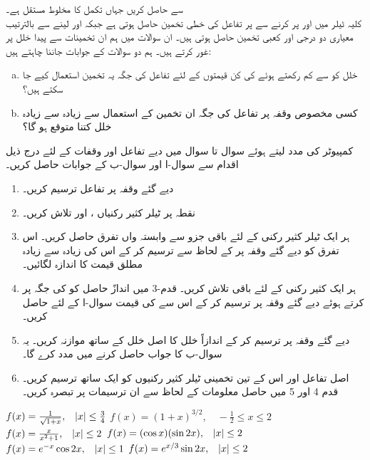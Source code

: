 سے حاصل کریں جہاں  تکمل کا مخلوط مستقل ہے۔
\\
کلیہ ٹیلر میں  اور  پر کرنے سے  پر تفاعل کی خطی تخمین حاصل ہوتی ہے جبکہ  اور  لینے سے بالترتیب معیاری دو درجی اور کعبی تخمین حاصل ہوتی ہیں۔ ان سوالات میں ہم ان تخمینات سے پیدا خلل پر غور کرتے ہیں۔ ہم دو سوالات کے جوابات جاننا چاہتے ہیں:
\begin{enumerate}[a.]
\item
خلل کو  سے کم رکھتے ہوئے  کی کن قیمتوں کے لئے تفاعل کی جگہ یہ تخمین استعمال کیے جا سکتے ہیں؟
\item
کسی مخصوص وقفہ پر تفاعل کی جگہ ان تخمین کے استعمال سے زیادہ سے زیادہ خلل کتنا متوقع ہو گا؟
\end{enumerate}
کمپیوٹر کی مدد لیتے ہوئے سوال  تا سوال  میں دیے تفاعل اور وقفات کے لئے  درج ذیل اقدام سے سوال-ا اور سوال-ب کے جوابات حاصل کریں۔
\begin{enumerate}[1.]
\item
دیے گئے وقفہ پر تفاعل ترسیم کریں۔
\item
نقطہ  پر ٹیلر کثیر رکنیاں ،  اور  تلاش کریں۔ 
\item
ہر ایک ٹیلر کثیر رکنی کے لئے باقی جزو سے وابستہ   واں تفرق  حاصل کریں۔ اس تفرق کو دیے گئے وقفہ پر   کے لحاظ سے ترسیم کر کے اس کی زیادہ سے زیادہ مطلق قیمت  کا اندازہ لگائیں۔
\item
ہر ایک کثیر رکنی کے لئے باقی  تلاش کریں۔ قدم-3 میں اندازً حاصل  کو  کی جگہ پر کرتے ہوئے دیے گئے وقفہ پر  ترسیم کر کے اس سے  کی قیمت  سوال-ا  کے لئے حاصل کریں۔
\item
دیے گئے وقفہ پر  ترسیم کر کے  اندازاً خلل کا اصل خلل  کے ساتھ موازنہ کریں۔ یہ سوال-ب کا جواب حاصل کرنے میں مدد کرے گا۔
\item
اصل تفاعل اور اس کے تین تخمینی ٹیلر کثیر رکنیوں کو ایک ساتھ ترسیم کریں۔قدم 4 اور 5 میں حاصل معلومات کے لحاظ سے ان ترسیمات پر تبصرہ کریں۔

\end{enumerate}

$f(x)=\tfrac{1}{\sqrt{1+x}},\quad \abs{x}\le \tfrac{3}{4}$
$f(x)=(1+x)^{3/2},\quad -\tfrac{1}{2}\le x\le 2$
$f(x)=\tfrac{x}{x^2+1},\quad \abs{x}\le 2$
$f(x)=(\cos x)(\sin 2x),\quad \abs{x}\le 2$
$f(x)=e^{-x}\cos 2x,\quad \abs{x}\le 1$
$f(x)=e^{x/3}\sin 2x,\quad \abs{x}\le 2$

